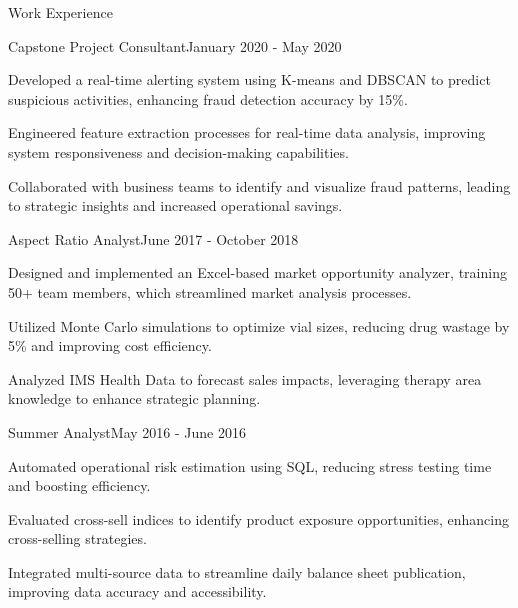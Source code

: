 \documentclass{resume} %
\begin{document}
    \begin{rSection}{Work Experience}
                    \begin{rSubsection}
                {Capstone Project Consultant}{January 2020 - May 2020}
                                    {}
                                {}
                                    \item Developed a real{-}time alerting system using K{-}means and DBSCAN to predict suspicious activities, enhancing fraud detection accuracy by 15\%.
                                    \item Engineered feature extraction processes for real{-}time data analysis, improving system responsiveness and decision{-}making capabilities.
                                    \item Collaborated with business teams to identify and visualize fraud patterns, leading to strategic insights and increased operational savings.
                            \end{rSubsection}
                    \begin{rSubsection}
                {Aspect Ratio Analyst}{June 2017 - October 2018}
                                    {}
                                {}
                                    \item Designed and implemented an Excel{-}based market opportunity analyzer, training 50+ team members, which streamlined market analysis processes.
                                    \item Utilized Monte Carlo simulations to optimize vial sizes, reducing drug wastage by 5\% and improving cost efficiency.
                                    \item Analyzed IMS Health Data to forecast sales impacts, leveraging therapy area knowledge to enhance strategic planning.
                            \end{rSubsection}
                    \begin{rSubsection}
                {Summer Analyst}{May 2016 - June 2016}
                                    {}
                                {}
                                    \item Automated operational risk estimation using SQL, reducing stress testing time and boosting efficiency.
                                    \item Evaluated cross{-}sell indices to identify product exposure opportunities, enhancing cross{-}selling strategies.
                                    \item Integrated multi{-}source data to streamline daily balance sheet publication, improving data accuracy and accessibility.
                            \end{rSubsection}
            \end{rSection}
\end{document}
